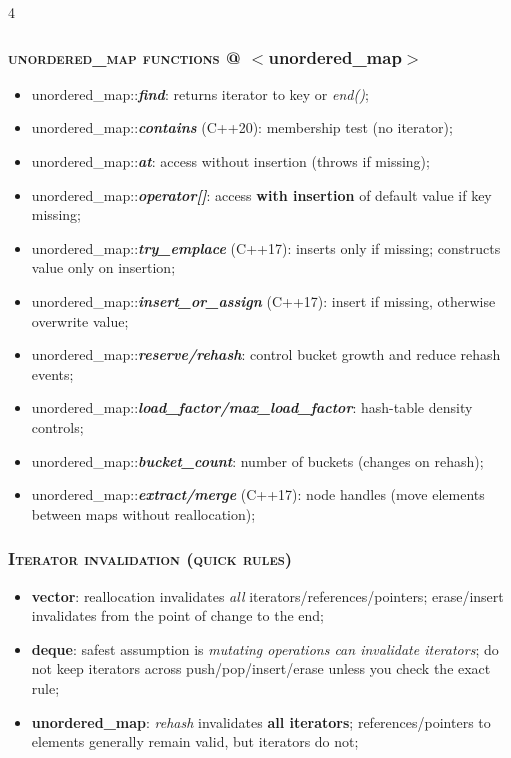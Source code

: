 \documentclass[10pt]{article}
\begin{document}
\begin{multicols*}{4}
{\subsubsection*{\textsc{unordered\_map functions} @ $<$unordered\_map$>$} 
\begin{itemize}[leftmargin=*,topsep=0.25pt]
  \setlength\itemsep{-1.8pt}
  \item unordered\_map::\emph{\textbf{find}}: returns iterator to key or \emph{end()};
  \item unordered\_map::\emph{\textbf{contains}} (C++20): membership test (no iterator);
  \item unordered\_map::\emph{\textbf{at}}: access without insertion (throws if missing);
  \item unordered\_map::\emph{\textbf{operator[]}}: access \textbf{with insertion} of default value if key missing;
  \item unordered\_map::\emph{\textbf{try\_emplace}} (C++17): inserts only if missing; constructs value only on insertion;
  \item unordered\_map::\emph{\textbf{insert\_or\_assign}} (C++17): insert if missing, otherwise overwrite value;
  \item unordered\_map::\emph{\textbf{reserve/rehash}}: control bucket growth and reduce rehash events;
  \item unordered\_map::\emph{\textbf{load\_factor/max\_load\_factor}}: hash-table density controls;
  \item unordered\_map::\emph{\textbf{bucket\_count}}: number of buckets (changes on rehash);
  \item unordered\_map::\emph{\textbf{extract/merge}} (C++17): node handles (move elements between maps without reallocation);
\end{itemize}

\subsubsection*{\textsc{Iterator invalidation (quick rules)}} 
\begin{itemize}[leftmargin=*,topsep=0.25pt]
  \setlength\itemsep{-1.8pt}
  \item \textbf{vector}: reallocation invalidates \emph{all} iterators/references/pointers; erase/insert invalidates from the point of change to the end;
  \item \textbf{deque}: safest assumption is \emph{mutating operations can invalidate iterators}; do not keep iterators across push/pop/insert/erase unless you check the exact rule;
  \item \textbf{unordered\_map}: \emph{rehash} invalidates \textbf{all iterators}; references/pointers to elements generally remain valid, but iterators do not;
\end{itemize}

}
\end{multicols*}
\end{document}
